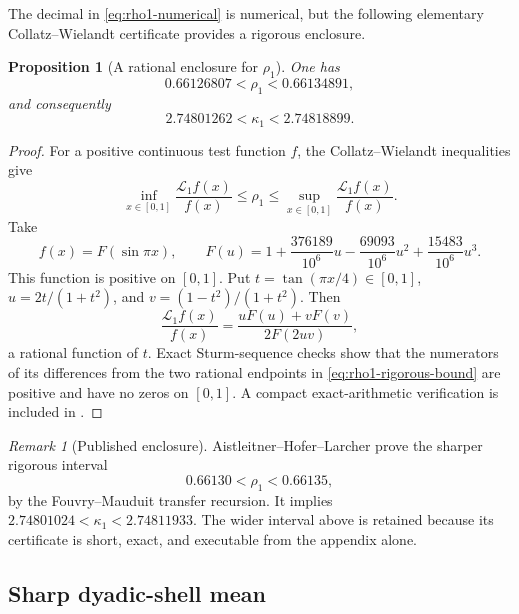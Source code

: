\documentclass[11pt,oneside]{article}
\newtheorem{proposition}[proposition]{Proposition}
\theoremstyle{definition}
\theoremstyle{remark}
\newtheorem{remark}[remark]{Remark}
\begin{document}
The decimal in \eqref{eq:rho1-numerical} is numerical, but the following elementary
Collatz--Wielandt certificate provides a rigorous enclosure.

\begin{proposition}[A rational enclosure for $\rho_1$]
\label{prop:rho1-rigorous-bound}
One has
\begin{equation}
 0.66126807<\rho_1<0.66134891,
 \label{eq:rho1-rigorous-bound}
\end{equation}
and consequently
\begin{equation}
 2.74801262<\kappa_1<2.74818899.
 \label{eq:kappa1-rigorous-bound}
\end{equation}
\end{proposition}

\begin{proof}
For a positive continuous test function $f$, the Collatz--Wielandt inequalities give
\[
 \inf_{x\in[0,1]}\frac{\mathcal L_1f(x)}{f(x)}
 \le\rho_1\le
 \sup_{x\in[0,1]}\frac{\mathcal L_1f(x)}{f(x)}.
\]
Take
\[
 f(x)=F(\sin\pi x),\qquad
 F(u)=1+\frac{376189}{10^6}u-\frac{69093}{10^6}u^2
       +\frac{15483}{10^6}u^3.
\]
This function is positive on $[0,1]$.  Put $t=\tan(\pi x/4)\in[0,1]$,
$u=2t/(1+t^2)$, and $v=(1-t^2)/(1+t^2)$.  Then
\[
 \frac{\mathcal L_1f(x)}{f(x)}
 =\frac{uF(u)+vF(v)}{2F(2uv)},
\]
a rational function of $t$.  Exact Sturm-sequence checks show that the numerators of its
differences from the two rational endpoints in \eqref{eq:rho1-rigorous-bound} are positive
and have no zeros on $[0,1]$.  A compact exact-arithmetic verification is included in
.
\end{proof}

\begin{remark}[Published enclosure]
Aistleitner--Hofer--Larcher prove the sharper rigorous interval
\begin{equation}
 0.66130<\rho_1<0.66135,
 \label{eq:rho1-AHL}
\end{equation}
by the Fouvry--Mauduit transfer recursion.  It implies
$2.74801024<\kappa_1<2.74811933$.  The wider interval above is retained because its
certificate is short, exact, and executable from the appendix alone.
\end{remark}

\subsection{Sharp dyadic-shell mean}
\end{document}

